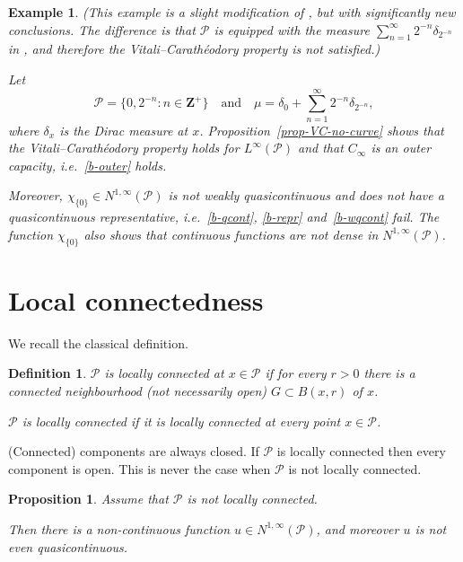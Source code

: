 \documentclass[a4paper,twoside]{article}
\theoremstyle{propositional}
\newtheorem{prop}[thm]{Proposition}
\theoremstyle{descriptive}
\newtheorem{deff}[thm]{Definition}
\newtheorem{example}[thm]{Example}
\newcommand{\Cinfty}{{C_\infty}}
\newcommand{\de}{\delta}
\newcommand{\Zp}{\mathbf{Z}^+}
\newcommand{\Ninfty}{N^{1,\infty}}
\newcommand{\NinftyP}{N^{1,\infty}(\P)}
\renewcommand{\P}{\mathcal{P}}
\numberwithin{equation}{section}
\begin{document}
\begin{example} \label{ex-2^{-n}-VC}
(This example is a slight modification of
\cite[Example~6.4]{BBLMaly}, 
but with significantly new conclusions.
The difference is that $\P$ is equipped with 
the measure $\sum_{n=1}^\infty 2^{-n} \de_{2^{-n}}$
in \cite[Example~6.4]{BBLMaly}, and therefore the Vitali--Carath\'eodory property
is not satisfied.)

Let 
\[ 
   \P=\{0,2^{-n}:n \in \Zp\}
\quad \text{and} \quad
\mu=\de_0 + \sum_{n=1}^\infty 2^{-n}
\de_{2^{-n}},
\]
where $\de_x$ is the Dirac measure at $x$.
Proposition~\ref{prop-VC-no-curve}
shows that the Vitali--Carath\'eodory property holds
for $L^\infty(\P)$ and that $\Cinfty$ is an outer capacity,
i.e.\ \ref{b-outer} holds.


Moreover, $\chi_{\{0\}} \in \NinftyP$ is not weakly quasicontinuous
and does not have a quasicontinuous representative,
i.e.\ \ref{b-qcont}, \ref{b-repr} and~\ref{b-wqcont} fail.
The function $\chi_{\{0\}}$ also
shows that continuous functions are not dense in $\Ninfty(\P)$.
\end{example}

\section{Local connectedness}

We recall the classical definition.

\begin{deff} \label{deff-lc}
$\P$ is \emph{locally connected at $x\in \P$}
if for every $r>0$ there is a connected neighbourhood
(not necessarily open) $G \subset B(x,r)$ of $x$.

$\P$ is \emph{locally connected} if it is locally connected at
every point $x \in \P$.
\end{deff}

(Connected) components are always closed.
If $\P$ is locally connected then every 
component is open.
This is never the case when $\P$ is not locally connected.

\begin{prop} \label{prop-not-loc-conn}
Assume that $\P$ is not locally connected.

Then there is a non-continuous function $u \in \NinftyP$,
and moreover $u$ is not even quasicontinuous.
\end{prop}
\end{document}
